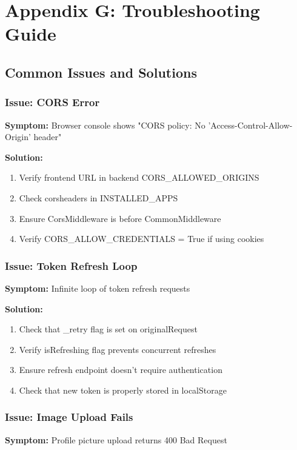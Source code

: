 \documentclass[11pt,a4paper]{article}
\begin{document}
\section{Appendix G: Troubleshooting Guide}

\subsection{Common Issues and Solutions}

\subsubsection{Issue: CORS Error}
\textbf{Symptom:} Browser console shows "CORS policy: No 'Access-Control-Allow-Origin' header"

\textbf{Solution:}
\begin{enumerate}[leftmargin=*]
    \item Verify frontend URL in backend CORS\_ALLOWED\_ORIGINS
    \item Check corsheaders in INSTALLED\_APPS
    \item Ensure CorsMiddleware is before CommonMiddleware
    \item Verify CORS\_ALLOW\_CREDENTIALS = True if using cookies
\end{enumerate}


\subsubsection{Issue: Token Refresh Loop}
\textbf{Symptom:} Infinite loop of token refresh requests

\textbf{Solution:}
\begin{enumerate}[leftmargin=*]
    \item Check that \_retry flag is set on originalRequest
    \item Verify isRefreshing flag prevents concurrent refreshes
    \item Ensure refresh endpoint doesn't require authentication
    \item Check that new token is properly stored in localStorage
\end{enumerate}

\subsubsection{Issue: Image Upload Fails}
\textbf{Symptom:} Profile picture upload returns 400 Bad Request
\end{document}
